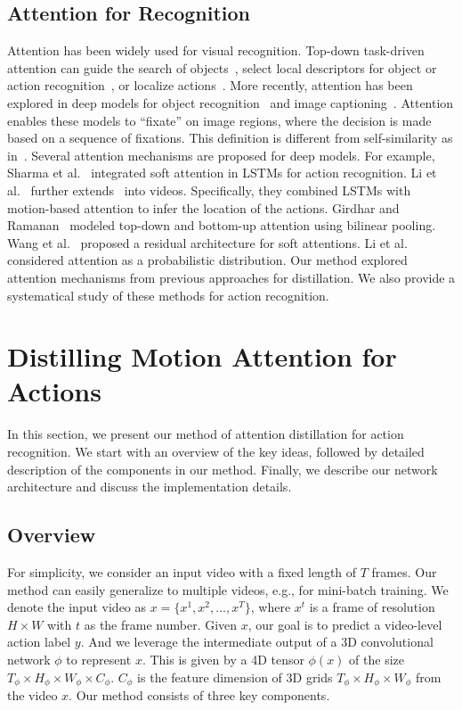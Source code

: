 \documentclass[10pt,twocolumn,letterpaper]{article}
\begin{document}
\subsection{Attention for Recognition}
Attention has been widely used for visual recognition. Top-down task-driven attention can guide the search of objects~\cite{oliva2003top}, select local descriptors for object or action recognition~\cite{gao2009discriminant,mathe}, or localize actions~\cite{gregNIPS}. More recently, attention has been explored in deep models for object recognition~\cite{mnih2014recurrent} and image captioning~\cite{xu2015show}. Attention enables these models to ``fixate'' on image regions, where the decision is made based on a sequence of fixations. This definition is different from self-similarity as in~\cite{vaswani2017attention}. 
Several attention mechanisms are proposed for deep models. For example, Sharma et al.\ \cite{sharma2015action} integrated soft attention in LSTMs for action recognition. Li et al.\ \cite{li2018videolstm} further extends~\cite{xu2015show} into videos. Specifically, they combined LSTMs with motion-based attention to infer the location of the actions. Girdhar and Ramanan~\cite{Girdhar_17b_AttentionalPoolingAction} modeled top-down and bottom-up attention using bilinear pooling. Wang et al.\ \cite{wang2017residual} proposed a residual architecture for soft attentions. Li et al.\ \cite{Li_2018_ECCV} considered attention as a probabilistic distribution. Our method explored attention mechanisms from previous approaches for distillation. We also provide a systematical study of these methods for action recognition. 


\section{Distilling Motion Attention for Actions}
In this section, we present our method of attention distillation for action recognition. We start with an overview of the key ideas, followed by detailed description of the components in our method. Finally, we describe our network architecture and discuss the implementation details.

\subsection{Overview}
For simplicity, we consider an input video with a fixed length of $T$ frames. Our method can easily generalize to multiple videos, e.g., for mini-batch training. We denote the input video as $x=\{x^1, x^2, ..., x^T\}$, where $x^t$ is a frame of resolution $H\times W$ with $t$ as the frame number. Given $x$, our goal is to predict a video-level action label $y$. And we leverage the intermediate output of a 3D convolutional network $\phi$ to represent $x$. This is given by a 4D tensor $\phi(x)$ of the size $T_\phi \times H_\phi \times W_\phi \times C_\phi$. $C_\phi$ is the feature dimension of 3D grids $T_\phi \times H_\phi \times W_\phi$ from the video $x$. Our method consists of three key components.
\end{document}
